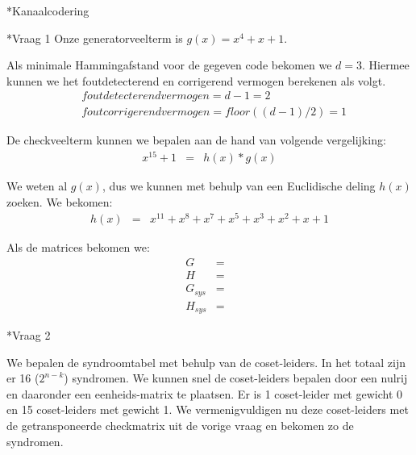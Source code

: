 \documentclass[]{article}
\begin{document}
\begin{section}*{Kanaalcodering}

    \begin{subsection}*{Vraag 1}
        Onze generatorveelterm is $g(x) = x^4 + x + 1$.

        Als minimale Hammingafstand voor de gegeven code bekomen we
        $d=3$. Hiermee kunnen we het foutdetecterend en corrigerend
        vermogen berekenen als volgt.
        \begin{eqnarray*}
            & foutdetecterend vermogen = d-1 = 2 \\
            & foutcorrigerend vermogen = floor((d-1)/2) = 1
        \end{eqnarray*}

        De checkveelterm kunnen we bepalen aan de hand van volgende
        vergelijking:
        \begin{eqnarray*}
            x^{15} + 1 &=& h(x) * g(x)
        \end{eqnarray*}

        We weten al $g(x)$, dus we kunnen met behulp van een
        Euclidische deling $h(x)$ zoeken. We bekomen:
        \begin{eqnarray*}
            h(x) &=& x^{11} + x^8 + x^7 + x^5 + x^3 + x^2 + x + 1
        \end{eqnarray*}

        Als de matrices bekomen we:
        \begin{eqnarray*}
            G &=&\\
            H &=&\\
            G_{sys} &=&\\
            H_{sys} &=&
        \end{eqnarray*}

    \end{subsection}

    \begin{subsection}*{Vraag 2} %

        We bepalen de syndroomtabel met behulp van de coset-leiders.
        In het totaal zijn er 16 ($2^{n-k}$) syndromen. We kunnen snel
        de coset-leiders bepalen door een nulrij en daaronder een
        eenheids-matrix te plaatsen. Er is 1 coset-leider met gewicht
        0 en 15 coset-leiders met gewicht 1. We vermenigvuldigen nu
        deze coset-leiders met de getransponeerde checkmatrix uit de
        vorige vraag en bekomen zo de syndromen.


\end{subsection}
\end{section}
\end{document}
